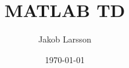 \documentclass[a4paper,10pt]{article}
\begin{document}
    \title{MATLAB TD}
    \author{Jakob Larsson}
    \date{\today}
    \maketitle{}

    
    
\end{document}
